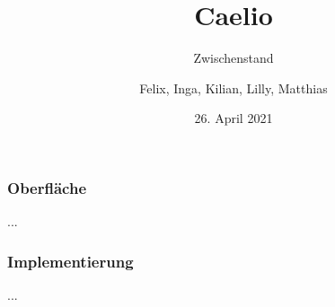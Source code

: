 \documentclass{beamer}
\title{Caelio}
\subtitle{Zwischenstand}
\author{Felix, Inga, Kilian, Lilly, Matthias}
\date{26. April 2021}
\begin{document}
	\begin{frame}
		\titlepage
	\end{frame}
	\begin{frame}
		\frametitle{Oberfläche}
		...
	\end{frame}
	\begin{frame}
		\frametitle{Implementierung}
		...
	\end{frame}
\end{document}
